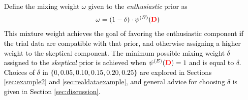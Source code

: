 \documentclass[12pt]{article}
\begin{document}
\textcolor{black}{
Define the mixing weight $\omega$ given to the \textit{enthusiastic} prior as
\begin{align}\label{eq:omega}
\omega= (1 - \delta)\cdot\psi^{(E)}(\textcolor{red}{\mathbf{D}})
\end{align}
This mixture weight achieves the goal of favoring the enthusiastic component if the trial data are compatible with that prior, and otherwise assigning a higher weight to the skeptical component. The minimum possible mixing weight $\delta$ assigned to the \textit{skeptical} prior is achieved when $\psi^{(E)}(\textcolor{red}{\mathbf{D}})=1$ and is equal to $\delta$. Choices of $\delta$ in $\{0, 0.05, 0.10, 0.15, 0.20, 0.25\}$ are explored in Sections \ref{sec:example2} and \ref{sec:realdataexample}, and general advice for choosing $\delta$ is given in Section \ref{sec:discussion}.}
%
%
\end{document}
